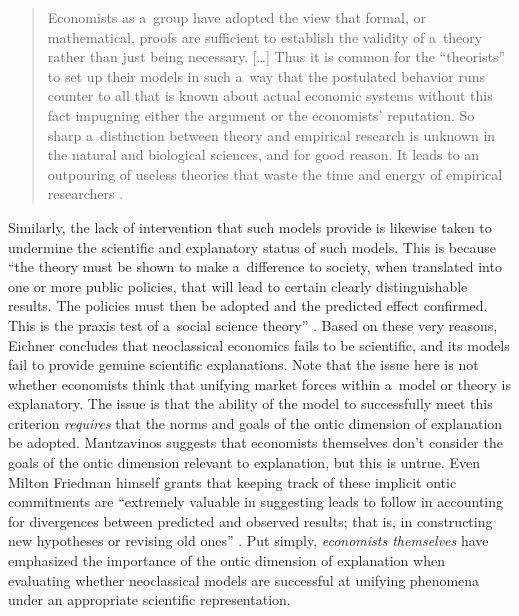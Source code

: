 \begin{quotation}
Economists as a~group have adopted the view that formal, or mathematical, proofs are sufficient to establish the validity of a~theory rather than just being necessary. […] Thus it is common for the ``theorists'' to set up their models in such a~way that the postulated behavior runs counter to all that is known about actual economic systems without this fact impugning either the argument or the economists' reputation. So sharp a~distinction between theory and empirical research is unknown in the natural and biological sciences, and for good reason. It leads to an outpouring of useless theories that waste the time and energy of empirical researchers
\parencite*[][p.517]{eichner_why_1983}.%


\end{quotation}
Similarly, the lack of intervention that such models provide is likewise taken to undermine the scientific and explanatory status of such models. This is because ``the theory must be shown to make a~difference to society, when translated into one or more public policies, that will lead to certain clearly distinguishable results. The policies must then be adopted and the predicted effect confirmed. This is the praxis test of a~social science theory''
\parencite[][p.510]{eichner_why_1983}. %
 Based on these very reasons, Eichner concludes that neoclassical economics fails to be scientific, and its models fail to provide genuine scientific explanations. Note that the issue here is not whether economists think that unifying market forces within a~model or theory is explanatory. The issue is that the ability of the model to successfully meet this criterion \textit{requires} that the norms and goals of the ontic dimension of explanation be adopted. Mantzavinos suggests that economists themselves don't consider the goals of the ontic dimension relevant to explanation, but this is untrue. Even Milton Friedman himself grants that keeping track of these implicit ontic commitments are ``extremely valuable in suggesting leads to follow in accounting for divergences between predicted and observed results; that is, in constructing new hypotheses or revising old ones'' 
\parencite[][p.31n]{friedman_essays_1953}. %
 Put simply, \textit{economists themselves} have emphasized the importance of the ontic dimension of explanation when evaluating whether neoclassical models are successful at unifying phenomena under an appropriate scientific representation.

